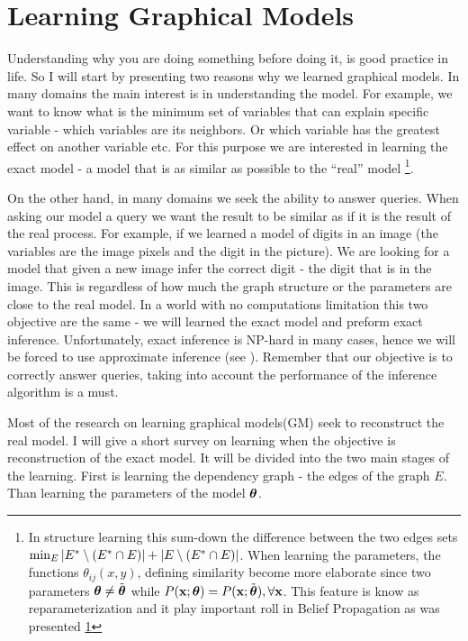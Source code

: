 \section{Learning Graphical Models}
Understanding why you are doing something before doing it, is good practice in life. 
So I will start by presenting two reasons why we learned graphical models.
In many domains the main interest is in understanding the model.
For example, we want to know what is the minimum set of variables that can explain specific variable - which variables are its neighbors.
Or which variable has the greatest effect on another variable etc.
For this purpose we are interested in learning the exact model - a model that is as similar as possible to the ``real'' model \footnote{
In structure learning this sum-down the difference between the two edges sets $ \min_{E} |{E}^{*}\setminus ({E}^{*} \cap E)| + |E \setminus ({E}^{*} \cap E)|$.
When learning the parameters, the functions $\theta_{ij}(x,y)$, defining similarity become more elaborate since two parameters $\boldsymbol{\theta} \neq \tilde{\boldsymbol{\theta}}$ while $P({\bf x}; \boldsymbol{\theta}) = P({\bf x}; \tilde{\boldsymbol{\theta}}), \forall {\bf x}$.
This feature is know as reparameterization and it play important roll in Belief Propagation as was presented \ref{}}.

On the other hand, in many domains we seek the ability to answer queries.
When asking our model a query we want the result to be similar as if it is the result of the real process.
For example, if we learned a model of digits in an image (the variables are the image pixels and the digit in the picture).
We are looking for a model that given a new image infer the correct digit - the digit that is in the image.
This is regardless of how much the graph structure or the parameters are close to the real model.
In a world with no computations limitation this two objective are the same - we will learned the exact model and preform exact inference.
Unfortunately, exact inference is NP-hard in many cases, hence we will be forced to use approximate inference (see ).
Remember that our objective is to correctly answer queries, taking into account the performance of the inference algorithm is a must.

Most of the research on learning graphical models(GM) seek to reconstruct the real model.
I will give a short survey on learning when the objective is reconstruction of the exact model.
It will be divided into the two main stages of the learning.
First is learning the dependency graph - the edges of the graph $E$.
Than learning the parameters of the model $\boldsymbol{\theta}$.
